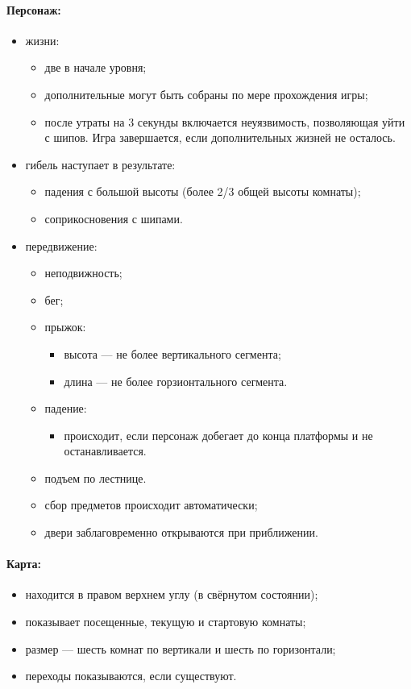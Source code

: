 \documentclass[12pt,a4paper,fullpage,titlepage]{article}
\begin{document}
\paragraph{Персонаж:}
\begin{itemize}
	\item жизни:
	\begin{itemize}
		\item две в начале уровня;
		\item дополнительные могут быть собраны по мере прохождения игры;
		\item после утраты на 3 секунды включается неуязвимость, позволяющая уйти с шипов. Игра завершается, если дополнительных жизней не осталось.
	\end{itemize}
	\item гибель наступает в результате:
	\begin{itemize}
		\item падения с большой высоты (более 2/3 общей высоты комнаты);
		\item соприкосновения с шипами.
	\end{itemize}
	\item передвижение:
	\begin{itemize}
		\item неподвижность;
		\item бег;
		\item прыжок:
		\begin{itemize}
			\item высота --- не более вертикального сегмента;
			\item длина --- не более горзионтального сегмента.
		\end{itemize}
		\item падение:
		\begin{itemize}
			\item происходит, если персонаж добегает до конца платформы и не останавливается.
		\end{itemize}
		\item подъем по лестнице.
		\item сбор предметов происходит автоматически;
		\item двери заблаговременно открываются при приближении.
	\end{itemize}
\end{itemize}

\paragraph{Карта:} 
\begin{itemize}
	\item находится в правом верхнем углу (в свёрнутом состоянии);
	\item показывает посещенные, текущую и стартовую комнаты;
	\item размер --- шесть комнат по вертикали и шесть по горизонтали;
	\item переходы показываются, если существуют.
\end{itemize}
\end{document}

